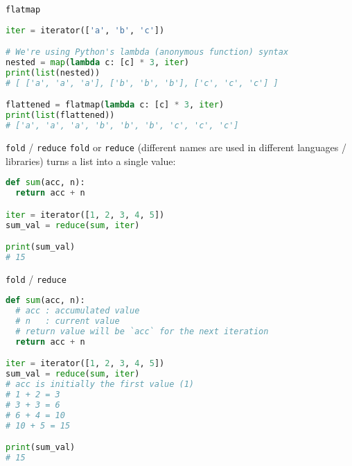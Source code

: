 \documentclass[../index.tex]{subfiles}
\begin{document}
\renewcommand{\currenttitle}{\texttt{flatmap}}
\begin{frame}[fragile]{\currenttitle}

  \begin{lstlisting}[language=Python]
iter = iterator(['a', 'b', 'c'])

# We're using Python's lambda (anonymous function) syntax
nested = map(lambda c: [c] * 3, iter)
print(list(nested))
# [ ['a', 'a', 'a'], ['b', 'b', 'b'], ['c', 'c', 'c'] ]

flattened = flatmap(lambda c: [c] * 3, iter)
print(list(flattened))
# ['a', 'a', 'a', 'b', 'b', 'b', 'c', 'c', 'c']
  \end{lstlisting}
\end{frame}

\renewcommand{\currenttitle}{\texttt{fold} / \texttt{reduce}}
\begin{frame}[fragile]{\currenttitle}
  \texttt{fold} or \texttt{reduce} (different names are used in different
  languages / libraries) turns a list into a single value: \\[1em]

  \begin{lstlisting}[language=Python]
def sum(acc, n):
  return acc + n

iter = iterator([1, 2, 3, 4, 5])
sum_val = reduce(sum, iter)

print(sum_val)
# 15
  \end{lstlisting}
\end{frame}

\begin{frame}[fragile]{\currenttitle}
  \vspace*{1em}
  \begin{lstlisting}[language=Python]
def sum(acc, n):
  # acc : accumulated value
  # n   : current value
  # return value will be `acc` for the next iteration
  return acc + n

iter = iterator([1, 2, 3, 4, 5])
sum_val = reduce(sum, iter)
# acc is initially the first value (1)
# 1 + 2 = 3
# 3 + 3 = 6
# 6 + 4 = 10
# 10 + 5 = 15

print(sum_val)
# 15
  \end{lstlisting}
\end{frame}
\end{document}
